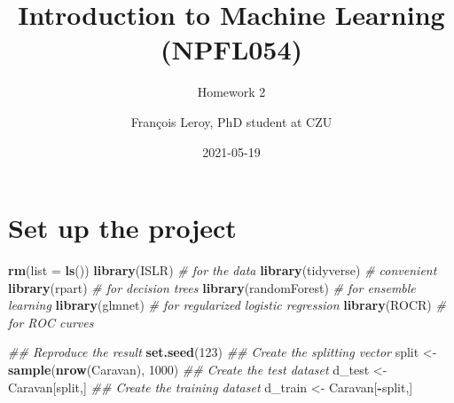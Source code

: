 \documentclass[
  12pt,
  oneside]{report}
\title{Introduction to Machine Learning\\
(NPFL054)}
\subtitle{Homework 2}
\author{François Leroy, PhD student at CZU}
\date{2021-05-19}
\newenvironment{Shaded}{\begin{snugshade}}{\end{snugshade}}
\newcommand{\CommentTok}[1]{\textcolor[rgb]{0.56,0.35,0.01}{\textit{#1}}}
\newcommand{\DataTypeTok}[1]{\textcolor[rgb]{0.13,0.29,0.53}{#1}}
\newcommand{\DecValTok}[1]{\textcolor[rgb]{0.00,0.00,0.81}{#1}}
\newcommand{\KeywordTok}[1]{\textcolor[rgb]{0.13,0.29,0.53}{\textbf{#1}}}
\newcommand{\NormalTok}[1]{#1}
\newcommand{\OperatorTok}[1]{\textcolor[rgb]{0.81,0.36,0.00}{\textbf{#1}}}
\newcommand{\StringTok}[1]{\textcolor[rgb]{0.31,0.60,0.02}{#1}}
\begin{document}
\maketitle


\cleardoublepage 
{}

{
\hypersetup{linkcolor=}
\setcounter{tocdepth}{1}
\tableofcontents
\newpage
}
\vspace{50mm}


\cleardoublepage 
{}


\hypertarget{set-up-the-project}{%
\chapter*{Set up the project}\label{set-up-the-project}}

\begin{Shaded}
\begin{Highlighting}[]
\KeywordTok{rm}\NormalTok{(}\DataTypeTok{list =} \KeywordTok{ls}\NormalTok{())}
\KeywordTok{library}\NormalTok{(ISLR) }\CommentTok{# for the data}
\KeywordTok{library}\NormalTok{(tidyverse) }\CommentTok{# convenient}
\KeywordTok{library}\NormalTok{(rpart) }\CommentTok{# for decision trees}
\KeywordTok{library}\NormalTok{(randomForest) }\CommentTok{# for ensemble learning}
\KeywordTok{library}\NormalTok{(glmnet) }\CommentTok{# for regularized logistic regression}
\KeywordTok{library}\NormalTok{(ROCR) }\CommentTok{# for ROC curves}
\end{Highlighting}
\end{Shaded}

\begin{Shaded}
\begin{Highlighting}[]
\CommentTok{## Reproduce the result}
\KeywordTok{set.seed}\NormalTok{(}\DecValTok{123}\NormalTok{)}
\CommentTok{## Create the splitting vector}
\NormalTok{split <-}\StringTok{ }\KeywordTok{sample}\NormalTok{(}\KeywordTok{nrow}\NormalTok{(Caravan), }\DecValTok{1000}\NormalTok{)}
\CommentTok{## Create the test dataset}
\NormalTok{d_test <-}\StringTok{ }\NormalTok{Caravan[split,]}
\CommentTok{## Create the training dataset}
\NormalTok{d_train <-}\StringTok{ }\NormalTok{Caravan[}\OperatorTok{-}\NormalTok{split,]}
\end{Highlighting}
\end{Shaded}
\end{document}
